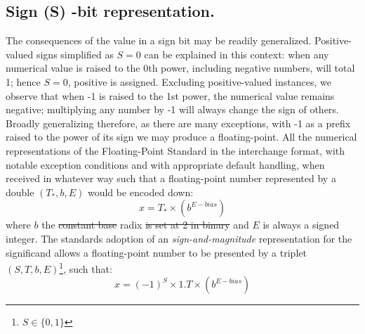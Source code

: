 \documentclass[7pt]{article}
\begin{document}
\subsection*{Sign (S) -bit representation.}
The consequences of the value in a sign bit may be readily generalized. Positive-valued signs simplified as $S= 0$ can be explained in this context: when any numerical value is raised to the 0th power, including negative numbers, will total 1; hence $S=0$, positive is assigned. Excluding positive-valued instances, we observe that when -1 is raised to the 1st power, the numerical value remains negative; multiplying any number by -1 will always change the sign of others. Broadly generalizing therefore, as there are many exceptions, with -1 as a prefix raised to the power of its sign we may produce a floating-point. All the numerical representations of the Floating-Point Standard in the interchange format, with notable exception conditions and with appropriate default handling, when received in whatever way such that a floating-point number represented by a double $(T_{*}, b, E)$ would be encoded down:
\begin{equation}
x = T_{*} \times (b^{E-bias})
\end{equation}
where $b$ the \st{constant base} radix \st{is set at 2 in binary} and $E$ is always a signed integer. The standards adoption of an \textit{sign-and-magnitude} representation for the significand  allows a floating-point number to be presented by a triplet $(S, T, b, E)$\footnote{$S \in \{0,1\}$ }, such that:
\begin{equation}
x = (-1)^{S}\times 1 . T \times (b^{E-bias})
\label{eq:IEEE754}
\end{equation}
\end{document}
